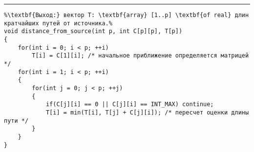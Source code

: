\documentclass{article}
\begin{document}
\vspace{5pt} \hrule
\begin{lstlisting}[caption={Определение расстояний от источника в бесконтурном графе}, label=p290, escapechar=\%]
%\noindent\textbf{Вход:} орграф G(V, E), заданный матрицей длин дуг C: \textbf{array} [1..p,1..p] \textbf{of real} и списками предшествующих узлов $\Gamma^{-1}$; источник имеет номер 1.\\%
%\textbf{Выход:} вектор T: \textbf{array} [1..p] \textbf{of real} длин кратчайших путей от источника.%
void distance_from_source(int p, int C[p][p], T[p])
{
	for(int i = 0; i < p; ++i)
		T[i] = C[1][i]; /* начальное приближение определяется матрицей */
	for(int i = 1; i < p; ++i)
	{
		for(int j = 0; j < p; ++j)
		{
			if(C[j][i] == 0 || C[j][i] == INT_MAX) continue;
			T[i] = min(T[i], T[j] + C[j][i]); /* пересчет оценки длины пути */
		}
	}
}
\end{lstlisting}
\end{document}
